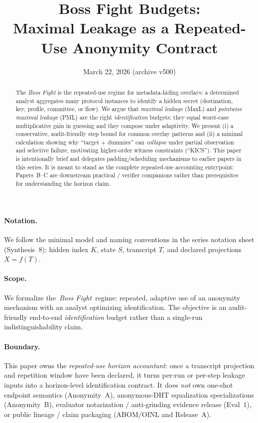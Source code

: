 \documentclass[11pt]{article}
\title{Boss Fight Budgets:\\ Maximal Leakage as a Repeated-Use Anonymity Contract}
\author{}
\date{March 22, 2026 (archive v500)}
\begin{document}
\maketitle

\begin{abstract}
The \emph{Boss Fight} is the repeated-use regime for metadata-hiding overlays: a determined analyst aggregates many protocol instances to identify a hidden secret (destination, key, profile, committee, or flow).
We argue that \emph{maximal leakage} (MaxL) and \emph{pointwise maximal leakage} (PML) are the right \emph{identification} budgets: they equal worst-case multiplicative gain in guessing and they compose under adaptivity.
We present (i) a conservative, audit-friendly step bound for common overlay patterns and (ii) a minimal calculation showing why ``target + dummies'' can \emph{collapse} under partial observation and selective failure, motivating higher-order witness constraints (``KICS'').
This paper is intentionally brief and delegates padding/scheduling mechanisms to earlier papers in this series.
It is meant to stand as the complete repeated-use accounting entrypoint: Papers~B--C are downstream practical / verifier companions rather than prerequisites for understanding the horizon claim.
\end{abstract}

\paragraph{Notation.}
We follow the minimal model and naming conventions in the series notation sheet (Synthesis~8): hidden index $K$, state $S$, transcript $T$, and declared projections $X=f(T)$.\cite{series:notation}

\paragraph{Scope.}
We formalize the \,\emph{Boss Fight}\, regime: repeated, adaptive use of an anonymity mechanism with an analyst optimizing identification.
The objective is an audit-friendly end-to-end \emph{identification} budget rather than a single-run indistinguishability claim.

\paragraph{Boundary.}
This paper owns the \emph{repeated-use horizon accountant}: once a transcript projection and repetition window have been declared, it turns per-run or per-step leakage inputs into a horizon-level identification contract.
It does \emph{not} own one-shot endpoint semantics (Anonymity~A), anonymous-DHT equalization specializations (Anonymity~B), evaluator notarization / anti-grinding evidence release (Eval~1), or public lineage / claim packaging (ABOM/OINL and Release~A).\cite{series:oddsinflation,series:profiling,series:evalnotary,series:abomoinl,series:releaseproperty}
\end{document}
